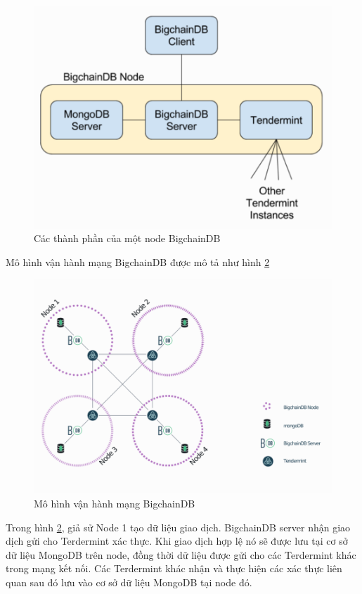 \begin{figure}[htbp]
\centering
\includegraphics[width=.9\linewidth]{img/bigchaindb_mechanism.png}
\caption{Các thành phần của một node BigchainDB}
\label{fig:bigchaindb_mechaism}
\end{figure}

Mô hình vận hành mạng BigchainDB được mô tả như hình \ref{fig:bigchaindb_communication}

\begin{figure}[htbp]
\centering
\includegraphics[width=.9\linewidth]{img/bigchaindb_communication.png}
\caption{Mô hình vận hành mạng BigchainDB}
\label{fig:bigchaindb_communication}
\end{figure}

Trong hình \ref{fig:bigchaindb_communication}, giả sử Node 1 tạo dữ liệu giao dịch. BigchainDB server nhận giao dịch gửi cho Terdermint xác thực. 
Khi giao dịch hợp lệ nó sẽ được lưu tại cơ sở dữ liệu MongoDB trên node, đồng thời dữ liệu được gửi cho các Terdermint khác trong mạng kết nối. 
Các Terdermint khác nhận và thực hiện các xác thực liên quan sau đó lưu vào cơ sở dữ liệu MongoDB tại node đó.

